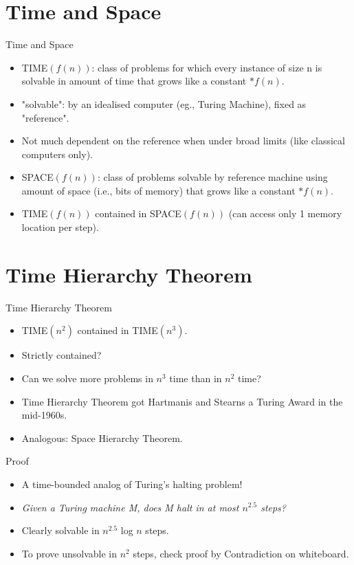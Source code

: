 \documentclass[
    11pt, %
    aspectratio=169, %
]{beamer}
\begin{document}
\section{Time and Space}
\begin{frame}{Time and Space}
\begin{itemize}
    \item TIME$(f(n))$: class of problems for which every instance of size n is solvable in amount of time that grows like a constant $* f(n)$.
    \item "solvable": by an idealised computer (eg., Turing Machine), fixed as "reference".
    \item Not much dependent on the reference when under broad limits (like classical computers only).
    \item<1-> SPACE$(f(n))$: class of problems solvable by reference machine using amount of space (i.e., bits of memory) that grows like a constant $* f(n)$.
    \item<2-> TIME$(f(n))$ contained in SPACE$(f(n))$ (can access only 1 memory location per step).
\end{itemize}
\end{frame}

\section{Time Hierarchy Theorem}
\begin{frame}{Time Hierarchy Theorem}
    \begin{itemize}
        \item TIME$(n^2)$ contained in TIME$(n^3)$. 
        \item<1-> Strictly contained?
        \item<2-> Can we solve more problems in $n^3$ time than in $n^2$ time?
        \item<3-> Time Hierarchy Theorem got Hartmanis and Stearns a Turing Award in the mid-1960s.
        \item<3-> Analogous: Space Hierarchy Theorem.
    \end{itemize}
\end{frame}

\begin{frame}{Proof}
    \begin{itemize}
        \item A time-bounded analog of Turing’s halting problem!
        \item \textit{Given a Turing machine M, does M halt in at most $n^{2.5}$ steps?}
        \item Clearly solvable in $n^{2.5}$ log $n$ steps.
        \item To prove unsolvable in $n^2$ steps, check proof by Contradiction on whiteboard.
    \end{itemize}
\end{frame}
\end{document}
